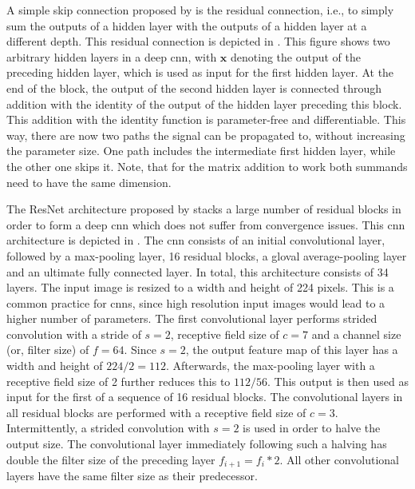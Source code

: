 A simple skip connection proposed by \citet{DBLP:conf/cvpr/HeZRS16} is the residual connection, i.e., to simply sum the outputs of a hidden layer with the outputs of a hidden layer at a different depth. This residual connection is depicted in . This figure shows two arbitrary hidden layers in a deep \gls{cnn}, with $\mathbf{x}$ denoting the output of the preceding hidden layer, which is used as input for the first hidden layer. At the end of the block, the output of the second hidden layer is connected through addition with the identity of the output of the hidden layer preceding this block. This addition with the identity function is parameter-free and differentiable. This way, there are now two paths the signal can be propagated to, without increasing the parameter size. One path includes the intermediate first hidden layer, while the other one skips it. Note, that for the matrix addition to work both summands need to have the same dimension.

The ResNet architecture proposed by \citep{DBLP:conf/cvpr/HeZRS16} stacks a large number of residual blocks in order to form a deep \gls{cnn} which does not suffer from convergence issues. This \gls{cnn} architecture is depicted in . The \gls{cnn} consists of an initial convolutional layer, followed by a max-pooling layer, 16 residual blocks, a gloval average-pooling layer and an ultimate fully connected layer. In total, this architecture consists of 34 layers. The input image is resized to a width and height of 224 pixels. This is a common practice for \glspl{cnn}, since high resolution input images would lead to a higher number of parameters. The first convolutional layer performs strided convolution with a stride of $s=2$, receptive field size of $c=7$ and a channel size (or, filter size) of $f=64$. Since $s=2$, the output feature map of this layer has a width and height of $224/2=112$. Afterwards, the max-pooling layer with a receptive field size of 2 further reduces this to $112/56$. This output is then used as input for the first of a sequence of 16 residual blocks. The convolutional layers in all residual blocks are performed with a receptive field size of $c=3$. Intermittently, a strided convolution with $s=2$ is used in order to halve the output size. The convolutional layer immediately following such a halving has double the filter size of the preceding layer $f_{i+1}=f_i*2$. All other convolutional layers have the same filter size as their predecessor.

